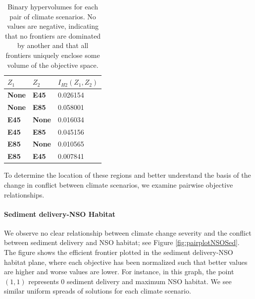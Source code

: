 \begin{table}[]
\centering
\caption[Binary hypervolume values for each pair of climate scenarios]{Binary hypervolumes for each pair of climate scenarios. No values are negative, indicating that no frontiers are dominated by another and that all frontiers uniquely enclose some volume of the objective space.}
\label{tab:binaryHypervols}
\begin{tabular}{ll|l}
\textbf{$Z_1$} & \textbf{$Z_2$} & \textbf{$I_{H2}(Z_1,Z_2)$} \\ \hline
\textbf{None}  & \textbf{E45}   & 0.026154                   \\
\textbf{None}  & \textbf{E85}   & 0.058001                   \\
\textbf{E45}   & \textbf{None}  & 0.016034                   \\
\textbf{E45}   & \textbf{E85}   & 0.045156                   \\
\textbf{E85}   & \textbf{None}  & 0.010565                   \\
\textbf{E85}   & \textbf{E45}   & 0.007841                  
\end{tabular}
\end{table}

To determine the location of these regions and better understand the basis of the change in conflict between climate scenarios, we examine pairwise objective relationships.

\paragraph{Sediment delivery-NSO Habitat}
We observe no clear relationship between climate change severity and the conflict between sediment delivery and NSO habitat; see Figure \ref{fig:pairplotNSOSed}. The figure shows the efficient frontier plotted in the sediment delivery-NSO habitat plane, where each objective has been normalized such that better values are higher and worse values are lower. For instance, in this graph, the point $(1,1)$ represents 0 sediment delivery and maximum NSO habitat. We see similar uniform spreads of solutions for each climate scenario.

